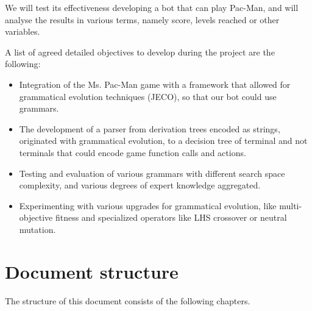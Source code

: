 We will test its effectiveness developing a bot that can play Pac-Man, and will analyse the results in various terms, namely score, levels reached or other variables.
 
A list of agreed detailed objectives to develop during the project are the following:
\begin{itemize}
\item Integration of the Ms. Pac-Man game with a framework that allowed for grammatical evolution techniques (JECO), so that our bot could use grammars.

\item The development of a parser from derivation trees encoded as strings, originated with grammatical evolution, to a decision tree of terminal and not terminals that could encode game function calls and actions.

\item Testing and evaluation of various grammars with different search space complexity, and various degrees of expert knowledge aggregated.

\item Experimenting with various upgrades for grammatical evolution, like multi-objective fitness and specialized operators like LHS crossover or neutral mutation. 
\end{itemize}

\section{Document structure}
The structure of this document consists of the following chapters.

